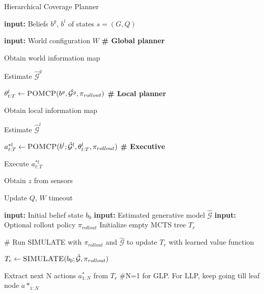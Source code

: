 



\begin{algorithm}[t!]
\caption{Hierarchical Coverage Planner}
\label{alg:hierarchicalPlanner}
\begin{multicols}{2}
\begin{algorithmic}
\STATE {}
\item \textbf{input: }Beliefs $b^g$, $b^l$ of states $s=(G, Q)$
\item \textbf{input: }World configuration $W$
\REPEAT
    \STATE \textbf{\# Global planner}
    \item  Obtain world information map
    \item Estimate $\hat{\mathcal{G}}^g$
    \item $\theta^l_{t:T} \gets \textsc{POMCP}(b^g, \hat{\mathcal{G}^g}, \pi_{rollout})$
    \STATE \textbf{\# Local planner}
    \item Obtain local information map
    \item Estimate $\hat{\mathcal{G}}^l$
    \item $a_{t:T}^{*l} \gets \textsc{POMCP}(b^l;\hat{\mathcal{G}}^l, \theta^l_{t:T}, \pi_{rollout})$ 
    \STATE \textbf{\# Executive}
    \item Execute $a_{t:T}^{*l}$
    \item Obtain $z$ from sensors
    \item Update $Q$, $W$
\UNTIL timeout
\end{algorithmic}

\begin{algorithmic}
\STATE {}
\STATE \textbf{input: }Initial belief state $b_0$
\STATE \textbf{input: }Estimated generative model $\hat{\mathcal{G}}$
\STATE \textbf{input: }Optional rollout policy $\pi_{rollout}$
\STATE Initialize empty MCTS tree $T_r$
\REPEAT
    \item \# Run SIMULATE with $\pi_{rollout}$ and $\hat{\mathcal{G}}$ to update $T_r$ with learned value function
    \item $T_r \gets \textsc{SIMULATE}(b_0; \hat{\mathcal{G}}, \pi_{rollout})$
\item Extract next N actions $a^*_{1:N}$ from $T_r$ \#N=1 for GLP. For LLP, keep going till leaf node
\RETURN $a*_{1:N}$
\STATE
\STATE
\STATE
\STATE
\end{algorithmic}

\end{multicols}
\end{algorithm}
